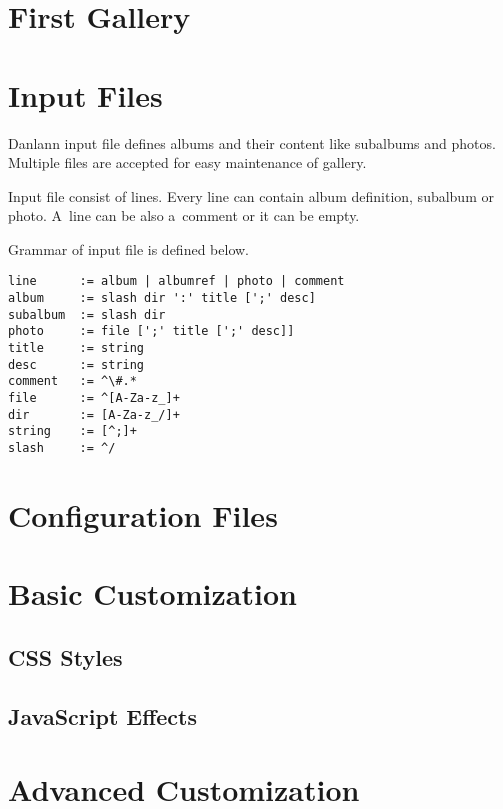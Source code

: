 \documentclass{article}
\begin{document}
\section{First Gallery}

\section{Input Files}
Danlann input file defines albums and their content like subalbums and
photos. Multiple files are accepted for easy maintenance of gallery.

Input file consist of lines. Every line can contain album definition,
subalbum or photo. A~line can be also a~comment or it can be empty.

Grammar of input file is defined below.

\begin{lstlisting}
line      := album | albumref | photo | comment
album     := slash dir ':' title [';' desc]
subalbum  := slash dir
photo     := file [';' title [';' desc]]
title     := string
desc      := string
comment   := ^\#.*
file      := ^[A-Za-z_]+
dir       := [A-Za-z_/]+
string    := [^;]+
slash     := ^/
\end{lstlisting}

\section{Configuration Files}

\section{Basic Customization}
\subsection{CSS Styles}
\subsection{JavaScript Effects}

\section{Advanced Customization}
\end{document}
